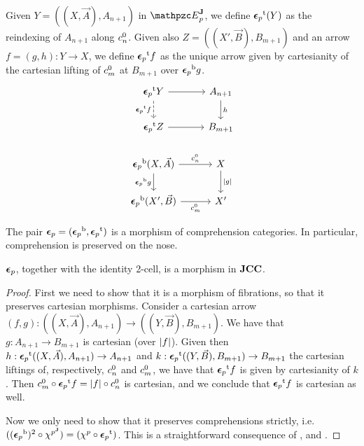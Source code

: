 \documentclass{lmcs} %
\theoremstyle{plain}\newtheorem{satz}[thm]{Satz} %
\begin{document}
			Given $Y=((X,\vec{A}), A_{n+1})$ in $\JDomE{p}$, we define ${\boldsymbol{\epsilon}_p}^{\mathrm{t}}(Y)$ as the reindexing of $A_{n+1}$ along $c^{0}_{n}$. Given also $Z=((X',\vec{B}), B_{m+1})$ and an arrow $f=(g,h):Y\to X$, we define ${\boldsymbol{\epsilon}_p}^{\mathrm{t}}f$ as the unique arrow given by cartesianity of the cartesian lifting of $c^{0}_{m}$ at $B_{m+1}$ over ${\boldsymbol{\epsilon}_p}^{\mathrm{b}}g$.
			\[\begin{tikzcd}
				{\ft{\twont{\epsilon}_p}Y} & {A_{n+1}} \\
				{\ft{\twont{\epsilon}_p}Z} & {B_{m+1}} \\
				{\fb{\twont{\epsilon}_p}(X,\vec{A})} & X \\
				{\fb{\twont{\epsilon}_p}(X',\vec{B})} & {X'}
				\arrow[from=1-1, to=1-2]
				\arrow["{\ft{\twont{\epsilon}_p}f}"', dashed, from=1-1, to=2-1]
				\arrow["h", from=1-2, to=2-2]
				\arrow[from=2-1, to=2-2]
				\arrow["{\C{0}{n}}", from=3-1, to=3-2]
				\arrow["{\fb{\twont{\epsilon}_p}g}"', from=3-1, to=4-1]
				\arrow["{\fp{g}}", from=3-2, to=4-2]
				\arrow["{\C{0}{m}}"', from=4-1, to=4-2]
			\end{tikzcd}\]


			The pair $\boldsymbol{\epsilon}_p=({\boldsymbol{\epsilon}_p}^{\mathrm{b}},{\boldsymbol{\epsilon}_p}^{\mathrm{t}})$ is a morphism of comprehension categories. In particular, comprehension is preserved on the nose.
			
			\begin{prop}
				$\boldsymbol{\epsilon}_p$, together with the identity 2-cell, is a morphism in $\mathbf{JCC}$.
			\end{prop}
			
			\begin{proof}
				First we need to show that it is a morphism of fibrations, so that it preserves cartesian morphisms. Consider a cartesian arrow $(f,g):((X,\vec{A}),A_{n+1})\to ((Y,\vec{B}), B_{m+1})$. We have that $g:A_{n+1}\to B_{m+1}$ is cartesian (over $|f|$). Given then $h:{\boldsymbol{\epsilon}_p}^{\mathrm{t}}((X,\vec{A}),A_{n+1})\to A_{n+1}$ and $k:{\boldsymbol{\epsilon}_p}^{\mathrm{t}}((Y,\vec{B}), B_{m+1})\to B_{m+1}$ the cartesian liftings of, respectively, $c^{0}_{n}$ and $c^{0}_{m}$, we have that ${\boldsymbol{\epsilon}_p}^{\mathrm{t}}f$ is given by cartesianity of $k$. Then $c^{0}_{m}\circ{\boldsymbol{\epsilon}_p}^{\mathrm{t}}f=|f|\circ c^{0}_{n}$ is cartesian, and we conclude that ${\boldsymbol{\epsilon}_p}^{\mathrm{t}}f$ is cartesian as well.
				
				Now we only need to show that it preserves comprehensions strictly, i.e. $(({\boldsymbol{\epsilon}_p}^{\mathrm{b}})^{2}\circ\chi^{{p}^{\mathbf{J}}})=(\chi^{p}\circ {\boldsymbol{\epsilon}_p}^{\mathrm{t}})$. This is a straightforward consequence of ,  and .
			\end{proof}
			
\end{document}
